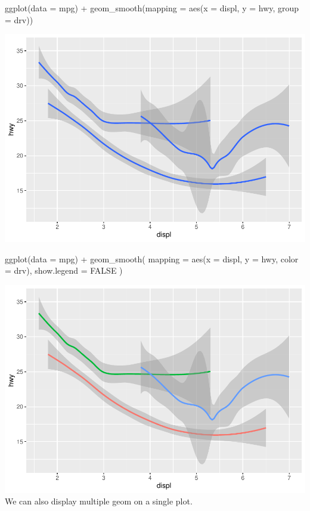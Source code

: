 \documentclass[
]{article}
\newenvironment{Shaded}{\begin{snugshade}}{\end{snugshade}}
\newcommand{\AttributeTok}[1]{\textcolor[rgb]{0.77,0.63,0.00}{#1}}
\newcommand{\ConstantTok}[1]{\textcolor[rgb]{0.00,0.00,0.00}{#1}}
\newcommand{\FunctionTok}[1]{\textcolor[rgb]{0.00,0.00,0.00}{#1}}
\newcommand{\NormalTok}[1]{#1}
\newcommand{\SpecialCharTok}[1]{\textcolor[rgb]{0.00,0.00,0.00}{#1}}
\begin{document}
\begin{Shaded}
\begin{Highlighting}[]
\FunctionTok{ggplot}\NormalTok{(}\AttributeTok{data =}\NormalTok{ mpg) }\SpecialCharTok{+}
  \FunctionTok{geom\_smooth}\NormalTok{(}\AttributeTok{mapping =} \FunctionTok{aes}\NormalTok{(}\AttributeTok{x =}\NormalTok{ displ, }\AttributeTok{y =}\NormalTok{ hwy, }\AttributeTok{group =}\NormalTok{ drv))}
\end{Highlighting}
\end{Shaded}

\includegraphics{Journal_files/figure-latex/unnamed-chunk-42-2.pdf}

\begin{Shaded}
\begin{Highlighting}[]
\FunctionTok{ggplot}\NormalTok{(}\AttributeTok{data =}\NormalTok{ mpg) }\SpecialCharTok{+}
  \FunctionTok{geom\_smooth}\NormalTok{(}
    \AttributeTok{mapping =} \FunctionTok{aes}\NormalTok{(}\AttributeTok{x =}\NormalTok{ displ, }\AttributeTok{y =}\NormalTok{ hwy, }\AttributeTok{color =}\NormalTok{ drv),}
    \AttributeTok{show.legend =} \ConstantTok{FALSE}
\NormalTok{  )}
\end{Highlighting}
\end{Shaded}

\includegraphics{Journal_files/figure-latex/unnamed-chunk-42-3.pdf} We
can also display multiple geom on a single plot.
\end{document}
